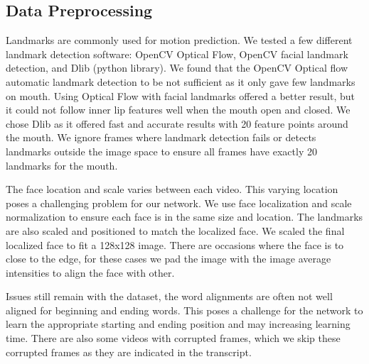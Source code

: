 \documentclass[10pt,twocolumn,letterpaper]{article}
\begin{document}
 \subsection{Data Preprocessing}
 Landmarks are commonly used for motion prediction. We tested a few different landmark detection software: OpenCV Optical Flow, OpenCV facial landmark detection, and Dlib (python library). We found that the OpenCV Optical flow automatic landmark detection to be not sufficient as it only gave few landmarks on mouth. Using Optical Flow with facial landmarks offered a better result, but it could not follow inner lip features well when the mouth open and closed. We chose Dlib as it offered fast and accurate results with 20 feature points around the mouth. We ignore frames where landmark detection fails or detects landmarks outside the image space to ensure all frames have exactly 20 landmarks for the mouth.
 
 The face location and scale varies between each video. This varying location poses a challenging problem for our network. We use face localization and scale normalization to ensure each face is in the same size and location. The landmarks are also scaled and positioned to match the localized face. We scaled the final localized face to fit a 128x128 image. There are occasions where the face is to close to the edge, for these cases we pad the image with the image average intensities to align the face with other.
 
 Issues still remain with the dataset, the word alignments are often not well aligned for beginning and ending words. This poses a challenge for the network to learn the appropriate starting and ending position and may increasing learning time. There are also some videos with corrupted frames, which we skip these corrupted frames as they are indicated in the transcript.


\end{document}
